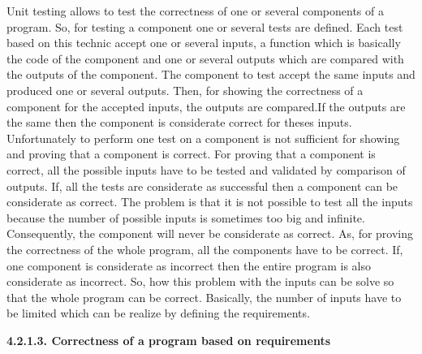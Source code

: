 \documentclass[conference,compsoc]{IEEEtran}
\begin{document}
Unit testing allows to test the correctness of one or several components of a program. So, for testing a component one or several tests are defined. Each test based on this technic accept one or several inputs, a function which is basically the code of the component and one or several outputs which are compared with the outputs of the component. The component to test accept the same inputs and produced one or several outputs. 
\newline
Then, for showing the correctness of a component for the accepted inputs, the outputs are compared.If the outputs are the same then the component is considerate correct for theses inputs. 
\newline
Unfortunately to perform one test on a component is not sufficient for showing and proving that a component is correct. For proving that a component is correct, all the possible inputs have to be tested and validated by comparison of outputs. If, all the tests are considerate as successful then a component can be considerate as correct. 
\newline
The problem is that it is not possible to test all the inputs because the number of possible inputs is sometimes too big and infinite. Consequently, the component will never be considerate as correct. As, for proving the correctness of the whole program, all the components have to be correct. If, one component is considerate as incorrect then the entire program is also considerate as incorrect. 
\newline
So, how this problem with the inputs can be solve so that the whole program can be correct. Basically, the number of inputs have to be limited which can be realize by defining the requirements.

\noindent
\newline\newline  
\textbf{4.2.1.3. Correctness of a program based on requirements}
\newline
\end{document}
